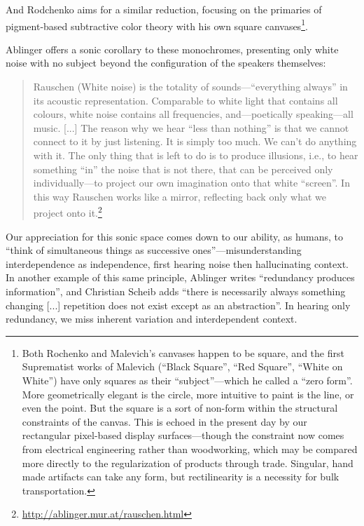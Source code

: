 \documentclass{thesis}
\begin{document}
And Rodchenko aims for a similar reduction, focusing on the primaries of pigment-based subtractive color theory with his own square canvases\footnote{Both Rochenko and Malevich's canvases happen to be square, and the first Suprematist works of Malevich (``Black Square'', ``Red Square'', ``White on White'') have only squares as their ``subject''---which he called a ``zero form''. More geometrically elegant is the circle, more intuitive to paint is the line, or even the point. But the square is a sort of non-form within the structural constraints of the canvas. This is echoed in the present day by our rectangular pixel-based display surfaces---though the constraint now comes from electrical engineering rather than woodworking, which may be compared more directly to the regularization of products through trade. Singular, hand made artifacts can take any form, but rectilinearity is a necessity for bulk transportation.}.

Ablinger offers a sonic corollary to these monochromes, presenting only white noise with no subject beyond the configuration of the speakers themselves:

	\begin{quote}
	Rauschen (White noise) is the totality of sounds---``everything always'' in its acoustic representation. Comparable to white light that contains all colours, white noise contains all frequencies, and---poetically speaking---all music. [...] The reason why we hear ``less than nothing'' is that we cannot connect to it by just listening. It is simply too much. We can't do anything with it. The only thing that is left to do is to produce illusions, i.e., to hear something ``in'' the noise that is not there, that can be perceived only individually---to project our own imagination onto that white ``screen''. In this way Rauschen works like a mirror, reflecting back only what we project onto it.\footnote{\url{http://ablinger.mur.at/rauschen.html}}
	\end{quote}
	
Our appreciation for this sonic space comes down to our ability, as humans, to ``think of simultaneous things as successive ones''\cite{christian_scheib_statics_????}---misunderstanding interdependence as independence, first hearing noise then hallucinating context. In another example of this same principle, Ablinger writes ``redundancy produces information'', and Christian Scheib adds ``there is necessarily always something changing [...] repetition does not exist except as an abstraction''. In hearing only redundancy, we miss inherent variation and interdependent context.
	
\end{document}
